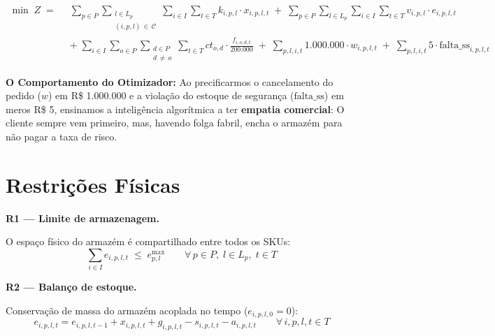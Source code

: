 \documentclass[12pt, a4paper]{article}
\begin{document}
\[
  \begin{aligned}
    \min \; Z \;=\;\;
    & \sum_{p \in P}\sum_{\substack{l \in L_p \\ (i,p,l)\,\in\,\mathcal{C}}}\sum_{i \in I}\sum_{t \in T}
        k_{i,p,l} \cdot x_{i,p,l,t}
      \;+\;
      \sum_{p \in P}\sum_{l \in L_p}\sum_{i \in I}\sum_{t \in T}
        v_{i,p,l} \cdot e_{i,p,l,t} \\[10pt]
    & +\;
      \sum_{i \in I}\sum_{o \in P}\sum_{\substack{d \in P \\ d \,\neq\, o}}\sum_{t \in T}
        ct_{o,d} \cdot \frac{f_{i,o,d,t}}{200{.}000}
      \;+\;
      \sum_{p,l,i,t} 1.000.000 \cdot w_{i,p,l,t}
      \;+\;
      \sum_{p,l,i,t} 5 \cdot \text{falta\_ss}_{i,p,l,t}
  \end{aligned}
\]

\textbf{O Comportamento do Otimizador:} Ao precificarmos o cancelamento do pedido ($w$) em R\$ 1.000.000 e a viola\c{c}\~{a}o do estoque de seguran\c{c}a ($\text{falta\_ss}$) em meros R\$ 5, ensinamos a intelig\^{e}ncia algor\'{i}tmica a ter \textbf{empatia comercial}: O cliente sempre vem primeiro, mas, havendo folga fabril, encha o armazém para n\~{a}o pagar a taxa de risco.

\newpage
\section{Restri\c{c}\~{o}es F\'{i}sicas}

\begin{mdframed}[style=destaque]
\textbf{\color{ballblue}R1 --- Limite de armazenagem.}
\medskip

O espa\c{c}o f\'{i}sico do armazém \'{e} compartilhado entre todos os SKUs:
\[
  \sum_{i \in I} e_{i,p,l,t} \;\leq\; e^{\max}_{p,l}
  \qquad \forall\, p \in P,\; l \in L_p,\; t \in T
\]
\end{mdframed}

\vspace{8pt}

\begin{mdframed}[style=destaque]
\textbf{\color{ballblue}R2 --- Balan\c{c}o de estoque.}
\medskip

Conserva\c{c}\~{a}o de massa do armazém acoplada no tempo ($e_{i,p,l,0} = 0$):
\[
  e_{i,p,l,t} = e_{i,p,l,t-1} + x_{i,p,l,t} + g_{i,p,l,t} - s_{i,p,l,t} - a_{i,p,l,t}
  \qquad \forall\, i, p, l, t \in T
\]
\end{mdframed}
\end{document}
